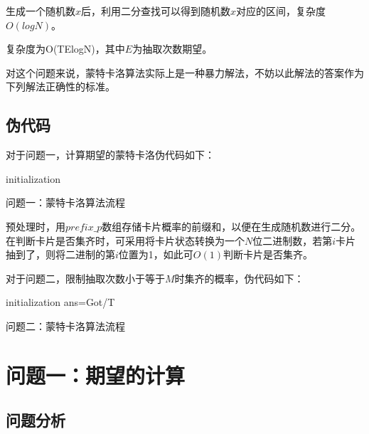 \documentclass[master]{thesis-uestc}
\begin{document}
生成一个随机数$x$后，利用二分查找可以得到随机数$x$对应的区间，复杂度$O(logN)$。

复杂度为O(TElogN)，其中$E$为抽取次数期望。

对这个问题来说，蒙特卡洛算法实际上是一种暴力解法，不妨以此解法的答案作为下列解法正确性的标准。

\section{伪代码}

对于问题一，计算期望的蒙特卡洛伪代码如下：

\begin{algorithm}[H]
 initialization\;
 \caption{问题一：蒙特卡洛算法流程}
\end{algorithm}

预处理时，用$prefix\_p$数组存储卡片概率的前缀和，以便在生成随机数进行二分。在判断卡片是否集齐时，可采用将卡片状态转换为一个$N$位二进制数，若第$i$卡片抽到了，则将二进制的第$i$位置为1，如此可$O(1)$判断卡片是否集齐。

对于问题二，限制抽取次数小于等于$M$时集齐的概率，伪代码如下：


\begin{algorithm}[H]
     initialization\;
     ans=Got/T\;
     \caption{问题二：蒙特卡洛算法流程}
    \end{algorithm}

\chapter{问题一：期望的计算}

\section{问题分析}
\end{document}
